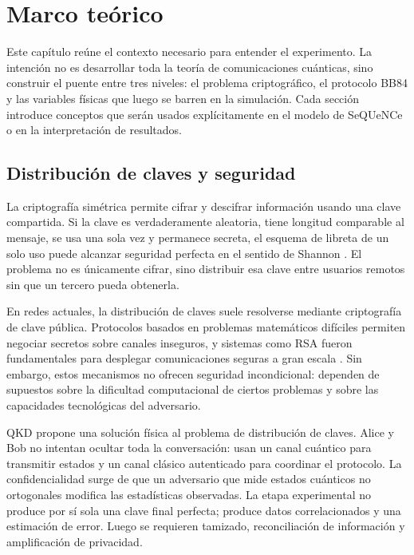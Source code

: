 \chapter{Marco teórico}
\label{chap:marco}

Este capítulo reúne el contexto necesario para entender el experimento. La intención no es desarrollar toda la teoría de comunicaciones cuánticas, sino construir el puente entre tres niveles: el problema criptográfico, el protocolo BB84 y las variables físicas que luego se barren en la simulación. Cada sección introduce conceptos que serán usados explícitamente en el modelo de SeQUeNCe o en la interpretación de resultados.

\section{Distribución de claves y seguridad}

La criptografía simétrica permite cifrar y descifrar información usando una clave compartida. Si la clave es verdaderamente aleatoria, tiene longitud comparable al mensaje, se usa una sola vez y permanece secreta, el esquema de libreta de un solo uso puede alcanzar seguridad perfecta en el sentido de Shannon \cite{shannon1949}. El problema no es únicamente cifrar, sino distribuir esa clave entre usuarios remotos sin que un tercero pueda obtenerla.

En redes actuales, la distribución de claves suele resolverse mediante criptografía de clave pública. Protocolos basados en problemas matemáticos difíciles permiten negociar secretos sobre canales inseguros, y sistemas como RSA fueron fundamentales para desplegar comunicaciones seguras a gran escala \cite{rivest1978rsa}. Sin embargo, estos mecanismos no ofrecen seguridad incondicional: dependen de supuestos sobre la dificultad computacional de ciertos problemas y sobre las capacidades tecnológicas del adversario.

QKD propone una solución física al problema de distribución de claves. Alice y Bob no intentan ocultar toda la conversación: usan un canal cuántico para transmitir estados y un canal clásico autenticado para coordinar el protocolo. La confidencialidad surge de que un adversario que mide estados cuánticos no ortogonales modifica las estadísticas observadas. La etapa experimental no produce por sí sola una clave final perfecta; produce datos correlacionados y una estimación de error. Luego se requieren tamizado, reconciliación de información y amplificación de privacidad.

